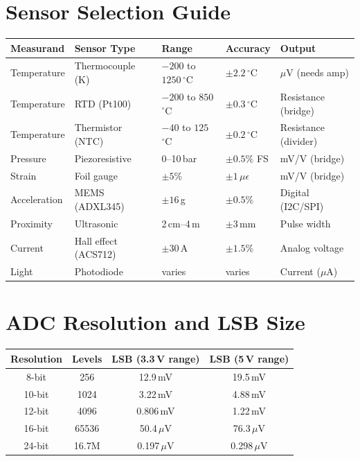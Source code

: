 \documentclass[11pt,letterpaper,twoside,openany]{book}
\newcommand{\degC}{\ensuremath{{}^{\circ}\text{C}}}
\begin{document}
\section*{Sensor Selection Guide}
\begin{center}
\begin{tabular}{p{2.5cm}p{3cm}p{2cm}p{2cm}p{3cm}}
\toprule
\textbf{Measurand} & \textbf{Sensor Type} & \textbf{Range} & \textbf{Accuracy} & \textbf{Output} \\
\midrule
Temperature & Thermocouple (K) & $-200$ to $1250$\,\degC{} & $\pm 2.2$\,\degC{} & $\mu$V (needs amp) \\
Temperature & RTD (Pt100) & $-200$ to $850$\,\degC{} & $\pm 0.3$\,\degC{} & Resistance (bridge) \\
Temperature & Thermistor (NTC) & $-40$ to $125$\,\degC{} & $\pm 0.2$\,\degC{} & Resistance (divider) \\
Pressure & Piezoresistive & 0--10\,bar & $\pm 0.5\%$ FS & mV/V (bridge) \\
Strain & Foil gauge & $\pm 5\%$ & $\pm 1\,\mu\epsilon$ & mV/V (bridge) \\
Acceleration & MEMS (ADXL345) & $\pm 16$\,g & $\pm 0.5\%$ & Digital (I2C/SPI) \\
Proximity & Ultrasonic & 2\,cm--4\,m & $\pm 3$\,mm & Pulse width \\
Current & Hall effect (ACS712) & $\pm 30$\,A & $\pm 1.5\%$ & Analog voltage \\
Light & Photodiode & varies & varies & Current ($\mu$A) \\
\bottomrule
\end{tabular}
\end{center}

\section*{ADC Resolution and LSB Size}
\begin{center}
\begin{tabular}{cccc}
\toprule
\textbf{Resolution} & \textbf{Levels} & \textbf{LSB (3.3\,V range)} & \textbf{LSB (5\,V range)} \\
\midrule
8-bit & 256 & 12.9\,mV & 19.5\,mV \\
10-bit & 1024 & 3.22\,mV & 4.88\,mV \\
12-bit & 4096 & 0.806\,mV & 1.22\,mV \\
16-bit & 65536 & 50.4\,$\mu$V & 76.3\,$\mu$V \\
24-bit & 16.7M & 0.197\,$\mu$V & 0.298\,$\mu$V \\
\bottomrule
\end{tabular}
\end{center}
\end{document}
